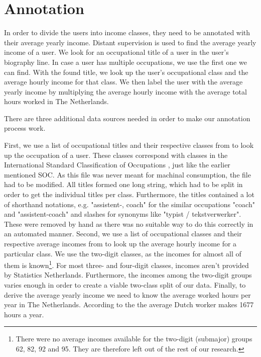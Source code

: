 \documentclass[
10pt, %
a4paper, %
oneside, %
headinclude,footinclude, %
] {book}%
\begin{document}
\section{Annotation}
In order to divide the users into income classes, they need to be annotated with their average yearly income. Distant supervision is used to find the average yearly income of a user. We look for an occupational title of a user in the user's biography line. In case a user has multiple occupations, we use the first one we can find. With the found title, we look up the user's occupational class and the average hourly income for that class. We then label the user with the average yearly income by multiplying the average hourly income with the average total hours worked in The Netherlands. 

There are three additional data sources needed in order to make our annotation process work. 

First, we use a list of occupational titles and their respective classes from \citet{codelijsten} to look up the occupation of a user. These classes correspond with classes in the International Standard Classification of Occupations \citep{isco}, just like the earlier mentioned SOC. As this file was never meant for machinal consumption, the file had to be modified. All titles formed one long string, which had to be split in order to get the individual titles per class. Furthermore, the titles contained a lot of shorthand notations, e.g. "assistent-, coach" for the similar occupations "coach" and "assistent-coach" and slashes for synonyms like "typist / tekstverwerker". These were removed by hand as there was no suitable way to do this correctly in an automated manner. 
Second, we use a list of occupational classes and their respective average incomes from \citet{uurlonen} to look up the average hourly income for a particular class. We use the two-digit classes, as the incomes for almost all of them is known\footnote{There were no average incomes available for the two-digit (submajor) groups 62, 82, 92 and 95. They are therefore left out of the rest of our research.}. For most three- and four-digit classes, incomes aren't provided by Statistics Netherlands. Furthermore, the incomes among the two-digit groups varies enough in order to create a viable two-class split of our data.
Finally, to derive the average yearly income we need to know the average worked hours per year in The Netherlands. According to the \citet{hours} the average Dutch worker makes 1677 hours a year.
\end{document}
